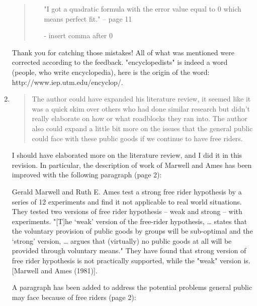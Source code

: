 \documentclass{article}
\newenvironment{itquote}
	{\begin{quote}\itshape}
	{\end{quote}\ignorespacesafterend}
\newenvironment{itpars}
	{\par\itshape}
	{\par}
\begin{document}
\begin{enumerate}
\begin{itquote}
\begin{itemize}
							"I got a quadratic formula with the error value equal to 0 which means perfect fit." – page 11
							
							- insert comma after 0

					\end{itemize}


				\end{itquote}

				Thank you for catching those mistakes! All of what was mentioned were corrected according to the feedback. "encyclopedists" is indeed a word (people, who write encyclopedia), here is the origin of the word: http://www.iep.utm.edu/encyclop/.

			\item

				\begin{itquote}

					The author could have expanded his literature review, it seemed like it was a quick skim over others who had done similar research but didn't really elaborate on how or what roadblocks they ran into. The author also could expand a little bit more on the issues that the general public could face with these public goods if we continue to have free riders.

				\end{itquote}

				I should have elaborated more on the literature review, and I did it in this revision. In particular, the description of work of Marwell and Ames has been improved with the following paragraph (page 2):

				\begin{itpars}

					Gerald Marwell and Ruth E. Ames test a strong free rider hypothesis by a series of 12 experiments and find it not applicable to real world situations. They tested two versions of free rider hypothesis – weak and strong – with experiments. "[T]he ‘weak’ version of the free-rider hypothesis, … states that the voluntary provision of public goods by groups will be sub-optimal and the ‘strong’ version, … argues that (virtually) no public goods at all will be provided through voluntary means." They have found that strong version of free rider hypothesis is not practically supported, while the "weak" version is. [Marwell and Ames (1981)].

				\end{itpars}

				A paragraph has been added to address the potential problems general public may face because of free riders (page 2):


\end{enumerate}
\end{document}
